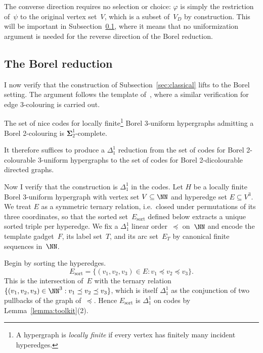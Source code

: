 \begin{remark}\label{rmk:reverse-simple}
	The converse direction requires no selection or choice: $\varphi$ is simply the restriction of~$\psi$ to the original vertex set~$V$, which is a subset of~$V_D$ by construction.
	This will be important in Subsection~\ref{sec:borel}, where it means that no uniformization argument is needed for the reverse direction of the Borel reduction.
\end{remark}

\subsection{The Borel reduction}\label{sec:borel}

I now verify that the construction of Subsection~\ref{sec:classical} lifts to the Borel setting.
The argument follows the template of~\cite[Theorem~A.9]{thornton2022algebraic}, where a similar verification for edge 3-colouring is carried out.

\begin{fact}\label{fact:hyp-borel}
	The set of nice codes for locally finite\footnote{A hypergraph is \emph{locally finite} if every vertex has finitely many incident hyperedges.} Borel 3-uniform hypergraphs admitting a Borel 2-colouring is $\mathbf\Sigma^1_2$-complete.
\end{fact}

It therefore suffices to produce a $\Delta^1_1$ reduction from the set of codes for Borel 2-colourable 3-uniform hypergraphs to the set of codes for Borel 2-dicolourable directed graphs.

Now I verify that the construction is $\Delta^1_1$ in the codes.
Let $H$ be a locally finite Borel 3-uniform hypergraph with vertex set $V\subseteq\NN$ and hyperedge set $E\subseteq V^3$.
We treat $E$ as a symmetric ternary relation, i.e.\ closed under permutations of its three coordinates, so that the sorted set~$E_{\mathrm{sort}}$ defined below extracts a unique sorted triple per hyperedge.
We fix a $\Delta^1_1$ linear order~$\preceq$ on~$\NN$ and encode the template gadget~$F$, its label set~$T$, and its arc set~$E_T$ by canonical finite sequences in~$\NN$.

Begin by sorting the hyperedges.
$$E_{\mathrm{sort}} = \{(v_1,v_2,v_3)\in E : v_1\preceq v_2\preceq v_3\}.$$
This is the intersection of~$E$ with the ternary relation $\{(v_1,v_2,v_3)\in\NN^3 : v_1\preceq v_2\preceq v_3\}$, which is itself $\Delta^1_1$ as the conjunction of two pullbacks of the graph of~$\preceq$.
Hence $E_{\mathrm{sort}}$ is $\Delta^1_1$ on codes by Lemma~\ref{lemma:toolkit}(2).

